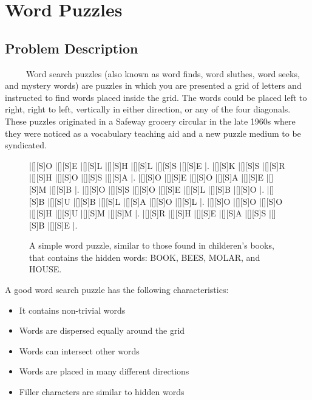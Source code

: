 \documentclass[12pt]{report}   %
\begin{document}
\chapter*{Word Puzzles}     %
    
\section*{Problem Description}       %

    \ \ \ \ \ Word search puzzles (also known as word finds, word sluthes, word seeks,
    and mystery words) are puzzles in which you are presented a grid of letters
    and instructed to find words placed inside the grid. The words could be
    placed left to right, right to left, vertically in either direction, or
    any of the four diagonals. These puzzles originated in a Safeway grocery
    circular in the late 1960s where they were noticed as a vocabulary
    teaching aid and a new puzzle medium to be syndicated. \cite{wiki}
    \cite{justws}

    \vspace{12pt}

    \begin{SCfigure}
        \begin{Puzzle}{7}{7}
            |[][S]O |[][S]E |[][S]L |[][S]H |[][S]L |[][S]S |[][S]E |.
            |[][S]K |[][S]S |[][S]R |[][S]H |[][S]O |[][S]S |[][S]A |.
            |[][S]O |[][S]E |[][S]O |[][S]A |[][S]E |[][S]M |[][S]B |.
            |[][S]O |[][S]S |[][S]O |[][S]E |[][S]L |[][S]B |[][S]O |.
            |[][S]B |[][S]U |[][S]B |[][S]L |[][S]A |[][S]O |[][S]L |.
            |[][S]O |[][S]O |[][S]O |[][S]H |[][S]U |[][S]M |[][S]M |.
            |[][S]R |[][S]H |[][S]E |[][S]A |[][S]S |[][S]B |[][S]E |.
        \end{Puzzle}
        \caption{A simple word puzzle, similar to those found in childeren's
                 books, that contains the hidden words: BOOK, BEES, MOLAR, and
                 HOUSE.}
    \end{SCfigure}

    A good word search puzzle has the following characteristics:

    \begin{itemize}
        \item It contains non-trivial words
        \item Words are dispersed equally around the grid
        \item Words can intersect other words
        \item Words are placed in many different directions
        \item Filler characters are similar to hidden words
    \end{itemize}
\end{document}
